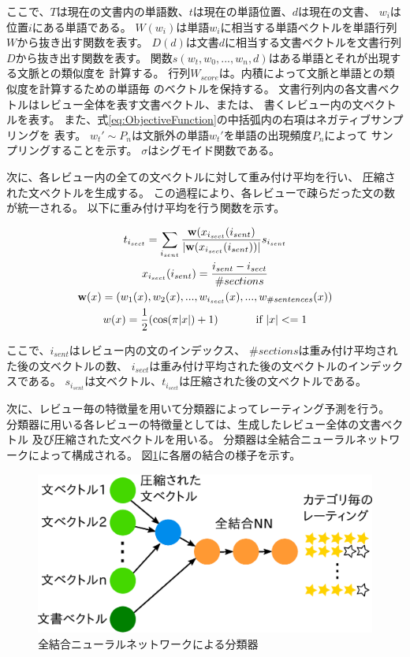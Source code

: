 \documentclass[twocolumn,a4paper]{ltjarticle}
\makeatletter
\let\tti@includegraphics\includegraphics
\renewcommand{\includegraphics}[1]{%
    \tti@includegraphics[width=\linewidth]{#1}}
\makeatother
\begin{document}
ここで、$T$は現在の文書内の単語数、$t$は現在の単語位置、$d$は現在の文書、
$w_i$は位置$i$にある単語である。
$W(w_i)$は単語$w_i$に相当する単語ベクトルを単語行列$W$から抜き出す関数を表す。
$D(d)$は文書$d$に相当する文書ベクトルを文書行列$D$から抜き出す関数を表す。
関数$s(w_t, w_0, ..., w_n, d)$はある単語とそれが出現する文脈との類似度を
計算する。
行列$W_{score}$は。内積によって文脈と単語との類似度を計算するための単語毎
のベクトルを保持する。
文書行列内の各文書ベクトルはレビュー全体を表す文書ベクトル、または、
書くレビュー内の文ベクトルを表す。
また、式\ref{eq:ObjectiveFunction}の中括弧内の右項はネガティブサンプリングを
表す。
$w_{t}' \sim P_n$は文脈外の単語$w_{t}'$を単語の出現頻度$P_n$によって
サンプリングすることを示す。
$\sigma$はシグモイド関数である。

次に、各レビュー内の全ての文ベクトルに対して重み付け平均を行い、
圧縮された文ベクトルを生成する。
この過程により、各レビューで疎らだった文の数が統一される。
以下に重み付け平均を行う関数を示す。

\begin{gather}
  t_{i_{sect}} = \sum_{i_{sent}} \frac{\mathbf{w}(x_{i_{sect}}(i_{sent})}
                                      {|\mathbf{w}(x_{i_{sect}}(i_{sent}))|}
                                 s_{i_{sent}} \\
  x_{i_{sect}}(i_{sent}) = \frac{i_{sent} - i_{sect}}{\#sections} \\
  \mathbf{w}(x) = (w_{1}(x), w_{2}(x), ..., w_{i_{sect}}(x),
                   ..., w_{\#sentences}(x)) \\
  w(x) = \frac{1}{2} (\cos(\pi|x|) + 1) \hspace{8ex} \text{if $|x| <= 1$}
\end{gather}

ここで、$i_{sent}$はレビュー内の文のインデックス、
$\#sections$は重み付け平均された後の文ベクトルの数、
$i_{sect}$は重み付け平均された後の文ベクトルのインデックスである。
$s_{i_{sent}}$は文ベクトル、$t_{i_{sect}}$は圧縮された後の文ベクトルである。

次に、レビュー毎の特徴量を用いて分類器によってレーティング予測を行う。
分類器に用いる各レビューの特徴量としては、生成したレビュー全体の文書ベクトル
及び圧縮された文ベクトルを用いる。
分類器は全結合ニューラルネットワークによって構成される。
図\ref{fig:MyModel}に各層の結合の様子を示す。

\begin{figure}
  \includegraphics{fig/model.eps}
  \caption{全結合ニューラルネットワークによる分類器}
  \label{fig:MyModel}
\end{figure}
\end{document}
